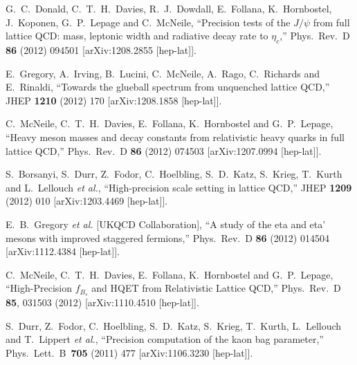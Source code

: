 \begin{thebibliography}{130}
  G.~C.~Donald, C.~T.~H.~Davies, R.~J.~Dowdall, E.~Follana,
  K.~Hornbostel, J.~Koponen, G.~P.~Lepage and C.~McNeile,
  ``Precision tests of the $J/{\psi}$ from full lattice QCD: mass,
  leptonic width and radiative decay rate to ${\eta}_c$,''
  Phys.\ Rev.\ D {\bf 86} (2012) 094501
  [arXiv:1208.2855 [hep-lat]].

  E.~Gregory, A.~Irving, B.~Lucini, C.~McNeile, A.~Rago, C.~Richards
  and E.~Rinaldi,
  ``Towards the glueball spectrum from unquenched lattice QCD,''
  JHEP {\bf 1210} (2012) 170
  [arXiv:1208.1858 [hep-lat]].

  C.~McNeile, C.~T.~H.~Davies, E.~Follana, K.~Hornbostel and
  G.~P.~Lepage,
  ``Heavy meson masses and decay constants from relativistic heavy
  quarks in full lattice QCD,''
  Phys.\ Rev.\ D {\bf 86} (2012) 074503
  [arXiv:1207.0994 [hep-lat]].

 S.~Borsanyi, S.~Durr, Z.~Fodor, C.~Hoelbling, S.~D.~Katz, S.~Krieg,
 T.~Kurth and L.~Lellouch {\it et al.},
  ``High-precision scale setting in lattice QCD,''
  JHEP {\bf 1209} (2012) 010
  [arXiv:1203.4469 [hep-lat]].


  E.~B.~Gregory {\it et al.}  [UKQCD Collaboration],
  ``A study of the eta and eta' mesons with improved staggered
  fermions,''
  Phys.\ Rev.\ D {\bf 86} (2012) 014504
  [arXiv:1112.4384 [hep-lat]].

  C.~McNeile, C.~T.~H.~Davies, E.~Follana, K.~Hornbostel and
  G.~P.~Lepage,
  ``High-Precision $f_{B_s}$ and HQET from Relativistic Lattice
  QCD,''
  Phys.\ Rev.\ D {\bf 85}, 031503 (2012)
  [arXiv:1110.4510 [hep-lat]].




  S.~Durr, Z.~Fodor, C.~Hoelbling, S.~D.~Katz, S.~Krieg, T.~Kurth,
  L.~Lellouch and T.~Lippert {\it et al.},
  ``Precision computation of the kaon bag parameter,''
  Phys.\ Lett.\ B\ {\bf 705} (2011) 477
  [arXiv:1106.3230 [hep-lat]].


\end{thebibliography}
